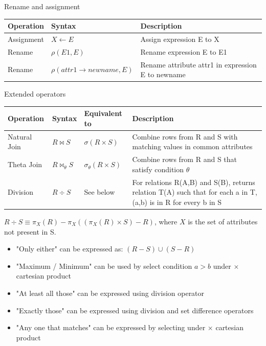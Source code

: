 \begin{theorem}
    {Rename and assignment}
    \begin{tabular}{l|l|l}
        Operation  & Syntax                       & Description                                       \\
        \hline
        Assignment & $X \gets E$                  & Assign expression E to X                          \\
        Rename     & $\rho(E1, E)$                & Rename expression E to E1                         \\
        Rename     & $\rho(attr1 \to newname, E)$ & Rename attribute attr1 in expression E to newname \\
    \end{tabular}
\end{theorem}

\begin{theorem}
    {Extended operators}
    \begin{tabular}{l|l|l|p{8cm}}
        Operation    & Syntax                 & Equivalent to                & Description                                                                                                    \\
        \hline
        Natural Join & $R \bowtie S$          & $\sigma(R\times S)$          & Combine rows from R and S with matching values in common attributes                                            \\
        Theta Join   & $R \bowtie_{\theta} S$ & $\sigma_{\theta}(R\times S)$ & Combine rows from R and S that satisfy condition $\theta$                                                      \\
        Division     & $R \div S$             & See below                    & For relations R(A,B) and S(B), returns relation T(A) such that for each a in T, (a,b) is in R for every b in S \\
    \end{tabular}

    $R\div S \equiv \pi_X(R)-\pi_X((\pi_X(R)\times S)-R)$, where $X$ is the set of attributes not present in S.

\end{theorem}

\begin{itemize}
    \item "Only either" can be expressed as: $(R - S) \cup (S - R)$
    \item "Maximum / Minimum" can be used by select condition $a > b$ under $\times$ cartesian product
    \item "At least all those" can be expressed using division operator
    \item "Exactly those" can be expressed using division and set difference operators
    \item "Any one that matches" can be expressed by selecting under $\times$ cartesian product
\end{itemize}